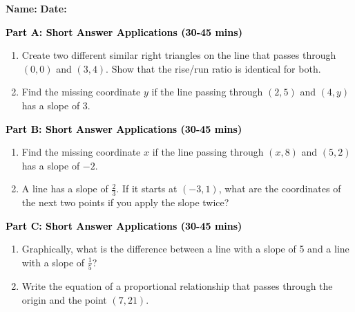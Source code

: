 \documentclass[12pt, letterpaper, fleqn]{article}
\begin{document}
\textbf{Name:} \underline{\hspace{5cm}}
\hfill
\textbf{Date:} \underline{\hspace{3cm}}\\


\begin{tcolorbox}[colback=customteal!20]
\large\textcolor{black}{\textbf{Part A: Short Answer Applications (30-45 mins)}}
\end{tcolorbox}

\vspace{3mm}

\begin{enumerate}[itemsep=4.2cm, leftmargin=0.6cm]
\item Create two different similar right triangles on the line that passes through $(0,0)$ and $(3, 4)$. Show that the rise/run ratio is identical for both.
\item Find the missing coordinate $y$ if the line passing through $(2, 5)$ and $(4, y)$ has a slope of 3.
\end{enumerate}

\newpage

\begin{tcolorbox}[colback=customteal!20]
\large\textcolor{black}{\textbf{Part B: Short Answer Applications (30-45 mins)}}
\end{tcolorbox}

\vspace{3mm}

\begin{enumerate}[itemsep=4.2cm, leftmargin=0.6cm, resume]
\item Find the missing coordinate $x$ if the line passing through $(x, 8)$ and $(5, 2)$ has a slope of $-2$.
\item A line has a slope of $\frac{2}{3}$. If it starts at $(-3, 1)$, what are the coordinates of the next two points if you apply the slope twice?
\end{enumerate}

\newpage

\begin{tcolorbox}[colback=customteal!20]
\large\textcolor{black}{\textbf{Part C: Short Answer Applications (30-45 mins)}}
\end{tcolorbox}

\vspace{3mm}

\begin{enumerate}[itemsep=4.2cm, leftmargin=0.6cm, resume]
\item Graphically, what is the difference between a line with a slope of 5 and a line with a slope of $\frac{1}{5}$?
\item Write the equation of a proportional relationship that passes through the origin and the point $(7, 21)$.
\end{enumerate}
\end{document}
